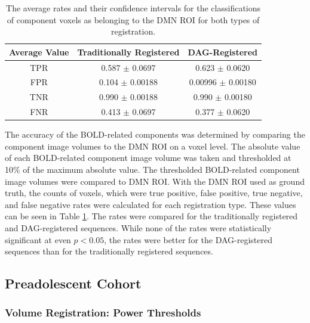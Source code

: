 \begin{table}[t!]
\centering
\caption{The average rates and their confidence intervals for the classifications of component voxels as belonging to the DMN ROI for both types of registration.}
\label{tab:spectr-avg-rates}
\begin{tabular}{|c|c|c|}
\hline
\textbf{Average Value} & \textbf{Traditionally Registered} & \textbf{DAG-Registered} \\ \hline
TPR                    & 0.587 $\pm$ 0.0697                & 0.623 $\pm$ 0.0620      \\ \hline
FPR                    & 0.104 $\pm$ 0.00188               & 0.00996 $\pm$ 0.00180   \\ \hline
TNR                    & 0.990 $\pm$ 0.00188               & 0.990 $\pm$ 0.00180     \\ \hline
FNR                    & 0.413 $\pm$ 0.0697                & 0.377 $\pm$ 0.0620      \\ \hline
\end{tabular}
\vspace{0.05\textwidth}
\end{table}

The accuracy of the BOLD-related components was determined by comparing the component image volumes to the DMN ROI on a voxel level. The absolute value of each BOLD-related component image volume was taken and thresholded at 10\% of the maximum absolute value. The thresholded BOLD-related component image volumes were compared to DMN ROI. With the DMN ROI used as ground truth, the counts of voxels, which were true positive, false positive, true negative, and false negative rates were calculated for each registration type. These values can be seen in Table \ref{tab:spectr-avg-rates}. The rates were compared for the traditionally registered and DAG-registered sequences. While none of the rates were statistically significant at even $ p < 0.05$, the rates were better for the DAG-registered sequences than for the traditionally registered sequences. 

\subsection{Preadolescent Cohort}

\subsubsection{Volume Registration: Power Thresholds}

